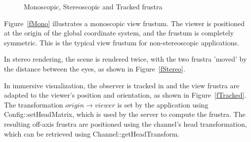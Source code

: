 \documentclass[10pt,a4]{scrartcl}
\newcommand{\fig}[1]{Figure~\ref{#1}}
\begin{document}
\begin{figure}[h!t]
  \hfil
  \hfil
  {\caption{\small\label{fImmersive}Monoscopic, Stereoscopic and Tracked
    frustra}}
\end{figure}

\fig{fMono} illustrates a monoscopic view frustum. The viewer is
positioned at the origin of the global coordinate system, and the
frustum is completely symmetric. This is the typical view frustum for
non-stereoscopic applications.

In stereo rendering, the scene is rendered twice, with the two frustra
'moved' by the distance between the eyes, as shown in \fig{fStereo}.

In immersive visualization, the observer is tracked in and the view
frustra are adapted to the viewer's position and orientation, as shown
in \fig{fTracked}. The transformation $origin \rightarrow viewer$ is set by
the application using \textsf{Config::setHeadMatrix}, which is used by
the server to compute the frustra. The resulting off-axis frustra are
positioned using the channel's head transformation, which can be
retrieved using \textsf{Channel::getHeadTransform}.
\end{document}
